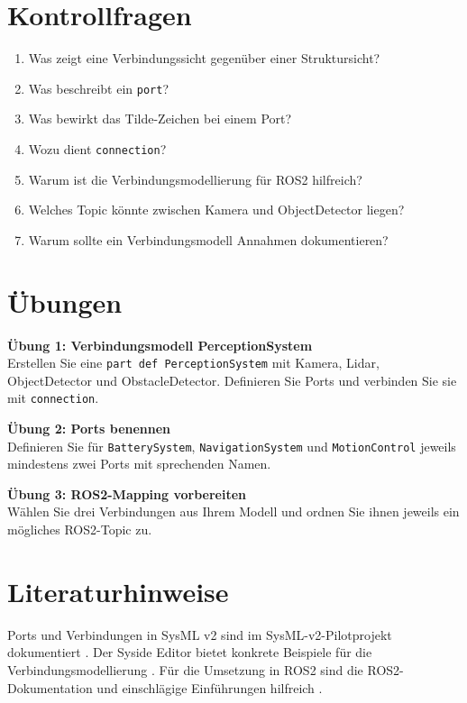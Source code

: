 \section{Kontrollfragen}
\begin{enumerate}
    \item Was zeigt eine Verbindungssicht gegenüber einer Struktursicht?
    \item Was beschreibt ein \texttt{port}?
    \item Was bewirkt das Tilde-Zeichen bei einem Port?
    \item Wozu dient \texttt{connection}?
    \item Warum ist die Verbindungsmodellierung für ROS2 hilfreich?
    \item Welches Topic könnte zwischen Kamera und ObjectDetector liegen?
    \item Warum sollte ein Verbindungsmodell Annahmen dokumentieren?
\end{enumerate}

\section{Übungen}
\begin{uebungbox}
\textbf{Übung 1: Verbindungsmodell PerceptionSystem}\\
Erstellen Sie eine \texttt{part def PerceptionSystem} mit Kamera, Lidar, ObjectDetector und ObstacleDetector. Definieren Sie Ports und verbinden Sie sie mit \texttt{connection}.
\end{uebungbox}

\begin{uebungbox}
\textbf{Übung 2: Ports benennen}\\
Definieren Sie für \texttt{BatterySystem}, \texttt{NavigationSystem} und \texttt{MotionControl} jeweils mindestens zwei Ports mit sprechenden Namen.
\end{uebungbox}

\begin{uebungbox}
\textbf{Übung 3: ROS2-Mapping vorbereiten}\\
Wählen Sie drei Verbindungen aus Ihrem Modell und ordnen Sie ihnen jeweils ein mögliches ROS2-Topic zu.
\end{uebungbox}

\section{Literaturhinweise}
Ports und Verbindungen in SysML v2 sind im SysML-v2-Pilotprojekt dokumentiert \cite{sysmlv2pilot}. Der Syside Editor bietet konkrete Beispiele für die Verbindungsmodellierung \cite{syside}. Für die Umsetzung in ROS2 sind die ROS2-Dokumentation und einschlägige Einführungen hilfreich \cite{ros2docs}.
